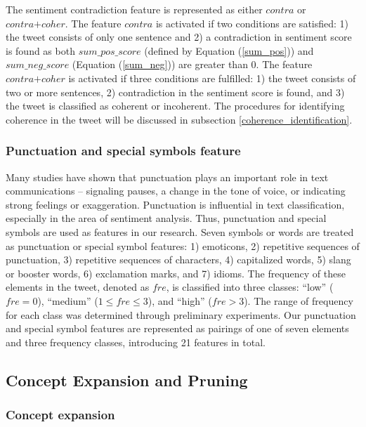\documentclass[english]{jnlp_1.4}
\begin{document}
The sentiment contradiction feature is represented as either $contra$ or $contra\mathrm{+}coher$.
The feature $contra$ is activated if two conditions are satisfied: 1) the tweet consists of only one sentence and 2) a contradiction in sentiment score is found as both $sum\_pos\_score$ (defined by Equation (\ref{sum_pos})) and $sum\_neg\_score$ (Equation (\ref{sum_neg})) are greater than 0.
The feature $contra\mathrm{+}coher$ is activated if three conditions are fulfilled: 1) the tweet consists of two or more sentences, 2) contradiction in the sentiment score is found, and 3) the tweet is classified as coherent or incoherent.
The procedures for identifying coherence in the tweet will be discussed in subsection \ref{coherence_identification}.


\subsubsection{Punctuation and special symbols feature}
\label{punctuation}

Many studies have shown that punctuation plays an important role in text communications -- signaling pauses, a change in the tone of voice, or indicating strong feelings or exaggeration.
Punctuation is influential in text classification, especially in the area of sentiment analysis.
Thus, punctuation and special symbols are used as features in our research.
Seven symbols or words are treated as punctuation or special symbol features: 1) emoticons, 2) repetitive sequences of punctuation, 3) repetitive sequences of characters, 4) capitalized words, 5) slang or booster words, 6) exclamation marks, and 7) idioms.
The frequency of these elements in the tweet, denoted as $fre$, is classified into three classes: ``low'' ($fre = 0$), ``medium'' ($1 \le fre \le 3$), and ``high'' ($fre > 3$).
The range of frequency for each class was determined through preliminary experiments.
Our punctuation and special symbol features are represented as pairings of one of seven elements and three frequency classes, introducing 21 features in total.


\subsection{Concept Expansion and Pruning}
\label{concept_level_expansion}


\subsubsection{Concept expansion}
\end{document}
